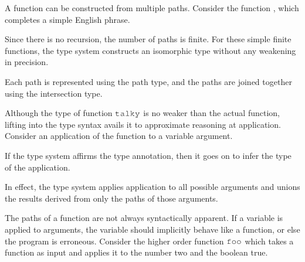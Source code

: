 \documentclass[table,dvipsnames,acmsmall]{acmart}
\theoremstyle{definition}
\begin{document}
A function can be constructed from multiple paths. 
Consider the function , which completes a simple English phrase.


\noindent
Since there is no recursion, the number of paths is finite.
For these simple finite functions, the type system constructs
an isomorphic type without any weakening in precision. 


\noindent
Each path is represented using the path type,
and the paths are joined together using the intersection type.

Although the type of function $\J{talky}$ is no weaker than the actual function,
lifting into the type syntax avails it to approximate reasoning at application.
Consider an application of the function to a variable argument. 


\noindent
If the type system affirms the type annotation,
then it goes on to infer the type of the application. 


\noindent
In effect, the type system applies application to all possible arguments
and unions the results derived from only the paths of those arguments. 

The paths of a function are not always syntactically apparent. 
If a variable is applied to arguments, the variable should implicitly behave 
like a function, or else the program is erroneous. 
Consider the higher order function $\J{foo}$ which takes a function as input
and applies it to the number two and the boolean true.

\end{document}
